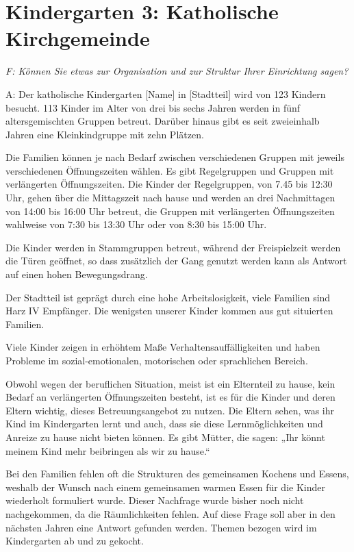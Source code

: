 \section{Kindergarten 3: Katholische Kirchgemeinde}
\begin{linenumbers*}
\emph{F: Können Sie etwas zur Organisation und zur Struktur Ihrer Einrichtung sagen?}

A: Der katholische Kindergarten [Name] in [Stadtteil] wird von 123 Kindern besucht. 113 Kinder im Alter von drei bis sechs Jahren werden in fünf altersgemischten Gruppen betreut.
Darüber hinaus gibt es seit zweieinhalb Jahren eine Kleinkindgruppe mit zehn Plätzen.
 
Die Familien können je nach Bedarf zwischen verschiedenen Gruppen mit jeweils verschiedenen Öffnungszeiten wählen. Es gibt Regelgruppen und Gruppen mit verlängerten Öffnungszeiten. Die Kinder der Regelgruppen, von 7.45 bis 12:30 Uhr, gehen über die Mittagszeit nach hause und werden an drei Nachmittagen von 14:00 bis 16:00 Uhr betreut, die Gruppen mit verlängerten Öffnungszeiten wahlweise von 7:30 bis 13:30 Uhr oder von 8:30 bis 15:00 Uhr.  

Die Kinder werden in Stammgruppen betreut, während der Freispielzeit werden die Türen geöffnet, so dass zusätzlich der Gang genutzt werden kann als Antwort auf einen hohen Bewegungsdrang. 

Der Stadtteil ist geprägt durch eine hohe Arbeitslosigkeit, viele Familien sind Harz IV Empfänger. Die wenigsten unserer Kinder kommen aus gut situierten Familien. 

Viele Kinder zeigen in erhöhtem Maße Verhaltensauffälligkeiten und haben Probleme im sozial-emotionalen, motorischen oder sprachlichen Bereich. 

Obwohl wegen der beruflichen Situation, meist ist ein Elternteil zu hause, kein Bedarf an verlängerten Öffnungszeiten besteht, 
ist es für die Kinder und deren Eltern wichtig, dieses Betreuungsangebot zu nutzen. Die Eltern sehen, was ihr Kind im Kindergarten lernt und auch, dass sie diese Lernmöglichkeiten und Anreize zu hause nicht bieten können.
Es gibt Mütter, die sagen: „Ihr könnt meinem Kind mehr beibringen als wir zu hause.“ 
 
Bei den Familien fehlen oft die Strukturen des gemeinsamen Kochens und Essens, weshalb der Wunsch nach einem gemeinsamen warmen Essen für die Kinder wiederholt formuliert wurde. Dieser Nachfrage wurde bisher noch nicht nachgekommen, da die Räumlichkeiten fehlen. Auf diese Frage soll aber in den nächsten Jahren eine Antwort gefunden werden. Themen bezogen wird im Kindergarten ab und zu gekocht.  


\end{linenumbers*}

